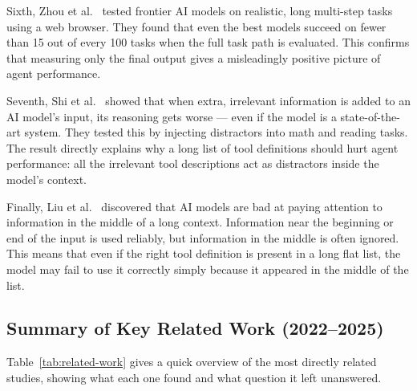 Sixth, Zhou et al.\ \cite{zhou2023webarena} tested frontier AI models on realistic, long multi-step tasks using a web browser. They found that even the best models succeed on fewer than 15 out of every 100 tasks when the full task path is evaluated. This confirms that measuring only the final output gives a misleadingly positive picture of agent performance.

Seventh, Shi et al.\ \cite{shi2024context} showed that when extra, irrelevant information is added to an AI model's input, its reasoning gets worse --- even if the model is a state-of-the-art system. They tested this by injecting distractors into math and reading tasks. The result directly explains why a long list of tool definitions should hurt agent performance: all the irrelevant tool descriptions act as distractors inside the model's context.

Finally, Liu et al.\ \cite{liu2024lost} discovered that AI models are bad at paying attention to information in the middle of a long context. Information near the beginning or end of the input is used reliably, but information in the middle is often ignored. This means that even if the right tool definition is present in a long flat list, the model may fail to use it correctly simply because it appeared in the middle of the list.

\subsection{Summary of Key Related Work (2022--2025)}

Table~\ref{tab:related-work} gives a quick overview of the most directly related studies, showing what each one found and what question it left unanswered.

